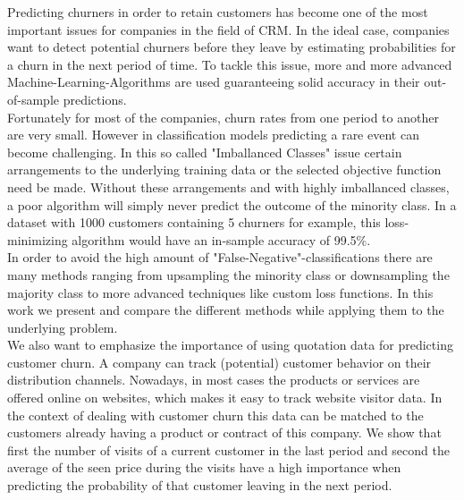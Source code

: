 \documentclass[12pt,titlepage]{article}
\begin{document}
Predicting churners in order to retain customers has become one of the most important issues for companies in the field of CRM. In the ideal case, companies want to detect potential churners before they leave by estimating probabilities for a churn in the next period of time. To tackle this issue, more and more advanced Machine-Learning-Algorithms
are used guaranteeing solid accuracy in their out-of-sample predictions. \\
Fortunately for most of the companies, churn rates from one period to another are very small. However in classification
models predicting a rare event can become challenging. In this so called "Imballanced Classes" issue certain arrangements to the underlying training data or the selected objective function need be made. Without these arrangements and with highly imballanced classes, a poor algorithm will simply never predict the outcome of the minority class. In a dataset with 1000 customers containing 5 churners for example, this loss-minimizing algorithm would have an in-sample accuracy of 99.5\%. \\
In order to avoid the high amount of "False-Negative"-classifications there are many methods ranging from upsampling the
minority class or downsampling the majority class to more advanced techniques like custom loss functions. In this work we present and compare the different methods while applying them to the underlying problem. \\
We also want to emphasize the importance of using quotation data for predicting customer churn. A company can
track (potential) customer behavior on their distribution channels. Nowadays, in most cases the products or services are
offered online on websites, which makes it easy to track website visitor data. In the context of dealing with customer
churn this data can be matched to the customers already having a product or contract of this company. We show that first the number of visits of a current customer in the last period and second the average of the seen price during the visits have a high importance when predicting the probability of that customer leaving in the next period. \\
\end{document}
